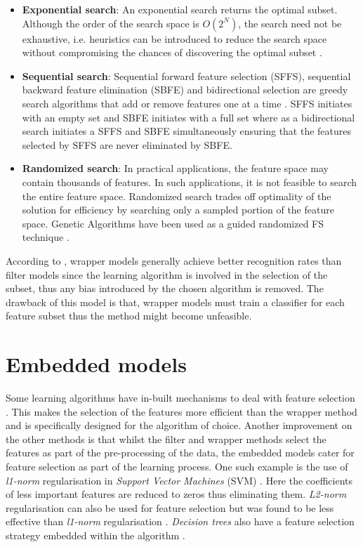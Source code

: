 \begin{itemize}
  \item\textbf{Exponential search}: An exponential search returns the optimal subset. Although the order of the search space is $O(2^N)$, the search need not be exhaustive, i.e. heuristics can be introduced to reduce the search space without compromising the chances of discovering the optimal subset \citep{liu2005toward}.
  \item\textbf{Sequential search}: Sequential forward feature selection (SFFS), sequential backward feature elimination (SBFE) and bidirectional selection are greedy search algorithms that add or remove features one at a time \citep{liu2005toward}. SFFS initiates with an empty set and SBFE initiates with a full set where as a bidirectional search initiates a SFFS and SBFE simultaneously ensuring that the features selected by SFFS are never eliminated by SBFE.
  \item\textbf{Randomized search}: In practical applications, the feature space may contain thousands of features. In such applications, it is not feasible to search the entire feature space. Randomized search trades off optimality of the solution for efficiency by searching only a sampled portion of the feature space. Genetic Algorithms have been used as a guided randomized FS technique \citep{cherkauer1996growing, vafaie1995genetic}.
\end{itemize}

According to \citet{sammut2017encyclopedia}, wrapper models generally achieve better recognition rates than filter models since the learning algorithm is involved in the selection of the subset, thus any bias introduced by the chosen algorithm is removed. The drawback of this model is that, wrapper models must train a classifier for each feature subset thus the method might become unfeasible.

\section{Embedded models}\label{sec:fs_filter}
Some learning algorithms have in-built mechanisms to deal with feature selection \citep{guyon2003introduction,sammut2017encyclopedia}. This makes the selection of the features more efficient than the wrapper method and is specifically designed for the algorithm of choice. Another improvement on the other methods is that whilst the filter and wrapper methods select the features as part of the pre-processing of the data, the embedded models cater for feature selection as part of the learning process. One such example is the use of \textit{l1-norm} regularisation in \textit{Support Vector Machines} (SVM) \citep{guyon2003introduction,de2015feature}. Here the coefficients of less important features are reduced to zeros thus eliminating them. \textit{L2-norm} regularisation can also be used for feature selection but was found to be less effective than \textit{l1-norm} regularisation \citep{de2015feature}. \textit{Decision trees} also have a feature selection strategy embedded within the algorithm \citep{garcia2015data}.

